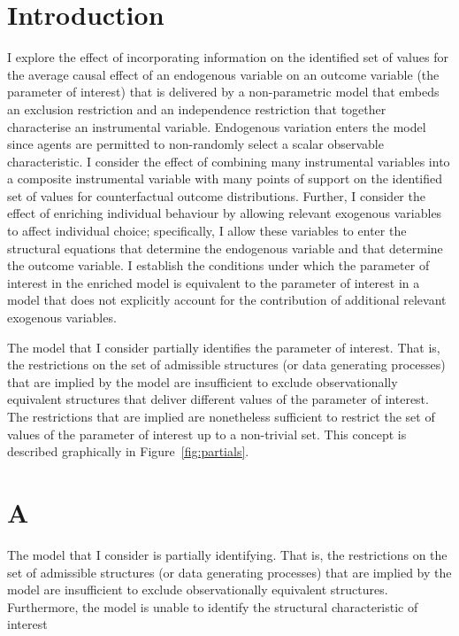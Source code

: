 \documentclass[10pt,a4paper,twoside]{article}
\numberwithin{equation}{subsection}
\begin{document}
\section{Introduction}
I explore the effect of incorporating information on the identified set of values for the average causal effect of an endogenous variable on an outcome variable (the parameter of interest) that is delivered by a non-parametric model that embeds an exclusion restriction and an independence restriction that together characterise an instrumental variable. Endogenous variation enters the model since agents are permitted to non-randomly select a scalar observable characteristic. I consider the effect of combining many instrumental variables into a composite instrumental variable with many points of support on the identified set of values for counterfactual outcome distributions. Further, I consider the effect of enriching individual behaviour by allowing relevant exogenous variables to affect individual choice; specifically, I allow these variables to enter the structural equations that determine the endogenous variable and that determine the outcome variable. I establish the conditions under which the parameter of interest in the enriched model is equivalent to the parameter of interest in a model that does not explicitly account for the contribution of additional relevant exogenous variables. 

The model that I consider partially identifies the parameter of interest. That is, the restrictions on the set of admissible structures (or data generating processes) that are implied by the model are insufficient to exclude observationally equivalent structures that deliver different values of the parameter of interest. The restrictions that are implied are nonetheless sufficient to restrict the set of values of the parameter of interest up to a non-trivial set. This concept is described graphically in Figure~\ref{fig:partials}. 
\section{A}
The model that I consider is partially identifying. That is, the restrictions on the set of admissible structures (or data generating processes) that are implied by the model are insufficient to exclude observationally equivalent structures. Furthermore, the model is unable to identify the structural characteristic of interest 

\end{document}
